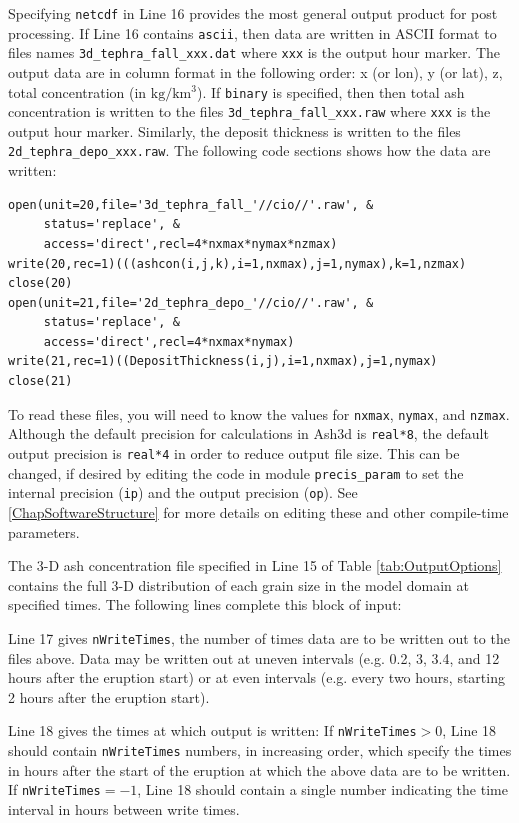 Specifying \texttt{netcdf} in Line 16 provides the most general output product for post
processing. If Line 16 contains \texttt{ascii}, then data are written in ASCII format
to files names \texttt{3d\_tephra\_fall\_xxx.dat} where \texttt{xxx} is the output hour marker.
The output data are in column format in the following order: x (or lon), y (or lat), z,
total concentration (in $\mathrm{kg/km^3}$).
If \texttt{binary} is specified, then then total ash concentration is written to the files
\texttt{3d\_tephra\_fall\_xxx.raw} where \texttt{xxx} is the output hour marker.
Similarly, the deposit thickness is written to the files \texttt{2d\_tephra\_depo\_xxx.raw}.
The following
code sections shows how the data are written:
\begin{verbatim}
open(unit=20,file='3d_tephra_fall_'//cio//'.raw', &
     status='replace', &
     access='direct',recl=4*nxmax*nymax*nzmax)
write(20,rec=1)(((ashcon(i,j,k),i=1,nxmax),j=1,nymax),k=1,nzmax)
close(20)
open(unit=21,file='2d_tephra_depo_'//cio//'.raw', &
     status='replace', &
     access='direct',recl=4*nxmax*nymax)
write(21,rec=1)((DepositThickness(i,j),i=1,nxmax),j=1,nymax)
close(21)
\end{verbatim}
To read these files, you will need to know the values for \texttt{nxmax},
\texttt{nymax}, and \texttt{nzmax}. Although the default precision for
calculations in Ash3d is \texttt{real*8}, the default output precision is
\texttt{real*4} in order to reduce output file size. This can be changed, if desired
by editing the code in module \texttt{precis\_param} to set the internal
precision (\texttt{ip}) and the output precision (\texttt{op}).
See \ref{ChapSoftwareStructure}
for more details on editing these and other compile-time parameters.

The 3-D ash concentration file specified in Line 15 of Table \ref{tab:OutputOptions}
contains the full
3-D distribution of each grain size in the model domain at specified times.
The following lines complete this block of input:

Line 17 gives \texttt{nWriteTimes}, the number of times data are to be written out to the
files above. Data may be written out at uneven intervals (e.g. 0.2, 3, 3.4, and
12 hours after the eruption start) or at even intervals (e.g. every two hours,
starting 2 hours after the eruption start).

Line 18 gives the times at which output is written:
If \texttt{nWriteTimes}$>0$, Line 18 should contain \texttt{nWriteTimes}
numbers, in increasing order,
which specify the times in hours after the start of the eruption at which the above
data are to be written.
If \texttt{nWriteTimes}$=-1$, Line 18 should contain a single number indicating the time
interval in hours between write times.

